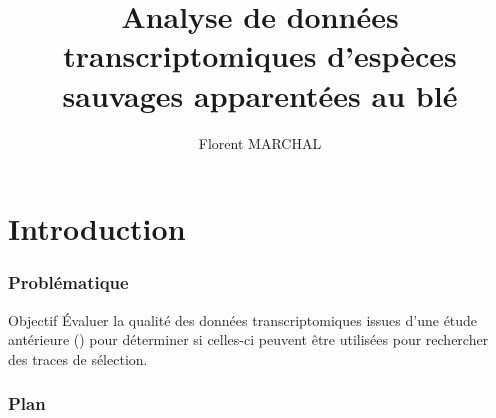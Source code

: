 


\title{Analyse de données
transcriptomiques d’espèces sauvages
apparentées au blé}
\author{Florent MARCHAL}



\section{Introduction}

\begin{frame}
    \frametitle{Problématique}
    
    \begin{alertblock}{Objectif}
       Évaluer la qualité des données transcriptomiques issues d’une étude antérieure (\cite{burgarella_mating_2024}) pour déterminer si celles-ci peuvent être utilisées pour rechercher des traces de sélection.
    \end{alertblock}
    
\end{frame}


\begin{frame}
    \frametitle{Plan}
    
    \tableofcontents[sectionstyle=show, subsectionstyle=show/show/hide]
    
\end{frame}


